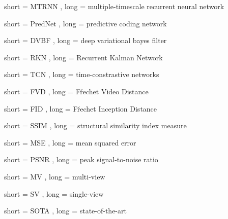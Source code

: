 


{
	short = MTRNN ,
	long = multiple-timescale recurrent neural network
}




{
	short = PredNet ,
	long = predictive coding network
}

{
	short = DVBF ,
	long = deep variational bayes filter
}

{
	short = RKN ,
	long = Recurrent Kalman Network
}

{
	short = TCN ,
	long = time-constrastive networks
}





{
	short = FVD ,
	long = Fŕechet Video Distance
}

{
	short = FID ,
	long = Fŕechet Inception Distance
}

{
	short = SSIM ,
	long = structural similarity index measure
}

{
	short = MSE ,
	long = mean squared error
}

{
	short = PSNR ,
	long = peak signal-to-noise ratio
}

{
	short = MV ,
	long = multi-view
}

{
	short = SV ,
	long = single-view
}

{
	short = SOTA ,
	long = state-of-the-art
}

